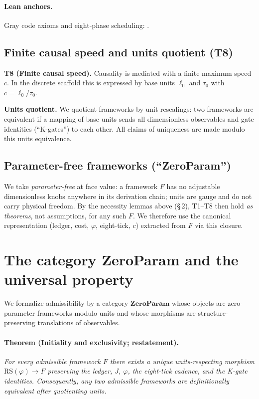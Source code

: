 \documentclass[11pt]{article}
\begin{document}
\paragraph{Lean anchors.} Gray code axioms and eight\mbox{-}phase scheduling: .

\subsection{Finite causal speed and units quotient (T8)}
\textbf{T8 (Finite causal speed).} Causality is mediated with a finite maximum speed \(c\). In the discrete scaffold this is expressed by base units \(\ell_0\) and \(\tau_0\) with \(c=\ell_0/\tau_0\).

\textbf{Units quotient.} We quotient frameworks by unit rescalings: two frameworks are equivalent if a mapping of base units sends all dimensionless observables and gate identities (``K\mbox{-}gates'') to each other. All claims of uniqueness are made modulo this units equivalence.

\subsection{Parameter\mbox{-}free frameworks (``ZeroParam'')}
We take \emph{parameter\mbox{-}free} at face value: a framework \(F\) has no adjustable dimensionless knobs anywhere in its derivation chain; units are gauge and do not carry physical freedom. By the necessity lemmas above (\S\,2), T1--T8 then hold \emph{as theorems}, not assumptions, for any such \(F\). We therefore use the canonical representation (ledger, cost, \(\varphi\), eight\mbox{-}tick, \(c\)) extracted from \(F\) via this closure.

\section{The category ZeroParam and the universal property}
We formalize admissibility by a category \(\mathbf{ZeroParam}\) whose objects are zero\mbox{-}parameter frameworks modulo units and whose morphisms are structure\mbox{-}preserving translations of observables.

\paragraph{Theorem (Initiality and exclusivity; restatement).} \emph{For every admissible framework \(F\) there exists a unique units\mbox{-}respecting morphism \(\mathrm{RS}(\varphi)\to F\) preserving the ledger, \(J\), \(\varphi\), the eight\mbox{-}tick cadence, and the K\mbox{-}gate identities. Consequently, any two admissible frameworks are definitionally equivalent after quotienting units.}
\end{document}

